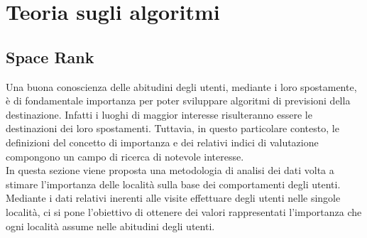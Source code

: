 \chapter{Teoria sugli algoritmi}

\section{Space Rank}
Una buona conoscienza delle abitudini degli utenti, mediante i loro spostamente,
\`e di fondamentale importanza per poter sviluppare algoritmi di previsioni della
destinazione. Infatti i luoghi di maggior interesse risulteranno essere le destinazioni
dei loro spostamenti. Tuttavia, in questo particolare contesto, le definizioni del
concetto di importanza e dei relativi indici di valutazione compongono un campo di
ricerca di notevole interesse.\\
In questa sezione viene proposta una metodologia di analisi dei dati volta
a stimare l'importanza delle localit\`a sulla base dei comportamenti degli utenti.
Mediante i dati relativi inerenti alle visite effettuare degli utenti nelle singole
localit\`a, ci si pone l'obiettivo di ottenere dei valori rappresentati l'importanza
che ogni localit\`a assume nelle abitudini degli utenti.

